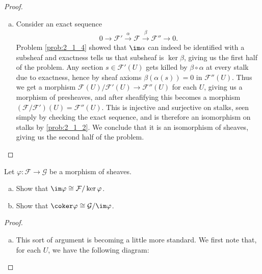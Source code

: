 \begin{problemset}
\begin{proof}
\begin{enumerate}[(a)]
			\item Consider an exact sequence
				\begin{align*}
					0 \to \mathcal F'\xrightarrow{\alpha} \mathcal F\xrightarrow{\beta} \mathcal F'' \to 0.
				\end{align*}
				Problem \ref{prob:2_1_4} showed that $\im\alpha$ can indeed be identified with a subsheaf and exactness tells us that subsheaf is $\ker\beta$, giving us the first half of the problem. Any section $s\in \mathcal F'(U)$ gets killed by $\beta\circ \alpha$ at every stalk due to exactness, hence by sheaf axioms $\beta(\alpha(s)) = 0$ in $\mathcal F''(U)$. Thus we get a morphism $\mathcal F(U)/\mathcal F'(U)\to \mathcal F''(U)$ for each $U$, giving us a morphism of presheaves, and after sheafifying this becomes a morphism $(\mathcal F/\mathcal F')(U) = \mathcal F'' (U)$. This is injective and surjective on stalks, seen simply by checking the exact sequence, and is therefore an isomorphism on stalks by \ref{prob:2_1_2}. We conclude that it is an isomorphism of sheaves, giving us the second half of the problem.
		\end{enumerate}
	\end{proof}
\item Let $\varphi:\mathcal F\to \mathcal G$ be a morphism of sheaves.
	\begin{enumerate}[(a)]
		\item Show that $\im\varphi \cong \mathcal F/\ker \varphi$.
		\item Show that $\coker\varphi\cong \mathcal G/\im \varphi$.
	\end{enumerate}
	\begin{proof}$ $
		\begin{enumerate}[(a)]
			\item This sort of argument is becoming a little more standard. We first note that, for each $U$, we have the following diagram:
				\begin{center}
\end{center}
\end{enumerate}
\end{proof}
\end{problemset}
